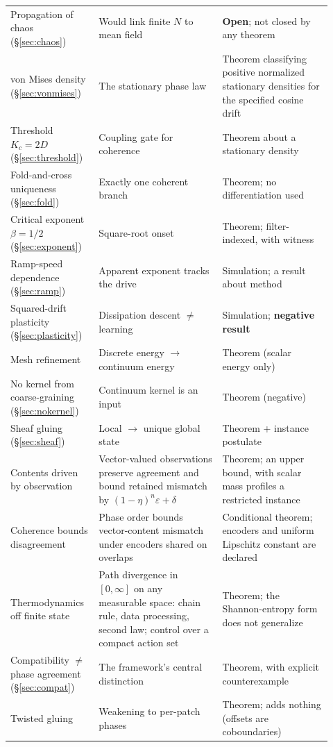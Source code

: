 \documentclass[11pt]{article}
\newcommand{\Kc}{K_{c}}
\begin{document}
\begin{longtable}{@{}p{0.24\linewidth}p{0.36\linewidth}p{0.32\linewidth}@{}}
Propagation of chaos (\S\ref{sec:chaos}) & Would link finite $N$ to mean field & \textbf{Open}; not closed by any theorem \\
von Mises density (\S\ref{sec:vonmises}) & The stationary phase law & Theorem classifying positive normalized stationary densities for the specified cosine drift \\
Threshold $\Kc=2D$ (\S\ref{sec:threshold}) & Coupling gate for coherence & Theorem about a stationary density \\
Fold-and-cross uniqueness (\S\ref{sec:fold}) & Exactly one coherent branch & Theorem; no differentiation used \\
Critical exponent $\beta=1/2$ (\S\ref{sec:exponent}) & Square-root onset & Theorem; filter-indexed, with witness \\
Ramp-speed dependence (\S\ref{sec:ramp}) & Apparent exponent tracks the drive & Simulation; a result about method \\
Squared-drift plasticity (\S\ref{sec:plasticity}) & Dissipation descent $\ne$ learning & Simulation; \textbf{negative result} \\
Mesh refinement & Discrete energy $\to$ continuum energy & Theorem (scalar energy only) \\
No kernel from coarse-graining (\S\ref{sec:nokernel}) & Continuum kernel is an input & Theorem (negative) \\
Sheaf gluing (\S\ref{sec:sheaf}) & Local $\to$ unique global state & Theorem + instance postulate \\
Contents driven by observation & \raggedright Vector-valued observations preserve agreement and bound retained mismatch by $(1-\eta)^n\varepsilon+\delta$ & \raggedright\arraybackslash Theorem; an upper bound, with scalar mass profiles a restricted instance \\
Coherence bounds disagreement & \raggedright Phase order bounds vector-content mismatch under encoders shared on overlaps & \raggedright\arraybackslash Conditional theorem; encoders and uniform Lipschitz constant are declared \\
Thermodynamics off finite state & Path divergence in $[0,\infty]$ on any measurable space: chain rule, data processing, second law; control over a compact action set & Theorem; the Shannon-entropy form does not generalize \\
Compatibility $\ne$ phase agreement (\S\ref{sec:compat}) & The framework's central distinction & Theorem, with explicit counterexample \\
Twisted gluing & Weakening to per-patch phases & Theorem; adds nothing (offsets are coboundaries) \\

\end{longtable}
\end{document}
